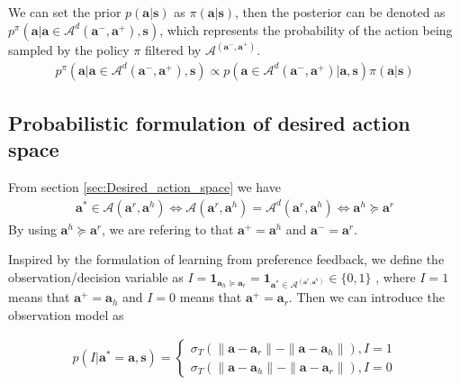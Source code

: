 We can set the prior $p(\bm a | \bm s)$ as $\pi(\bm a| \bm s)$, then
the posterior can be denoted as $ p^{\pi} (  \bm a |\bm a \in \mathcal{A}^d{(\bm a^-, \bm a^+)},  \bm s)$, which represents the probability of the action being sampled by the policy $\pi$ filtered by $\mathcal{A}^{(\bm a^-, \bm a^+)}$. 
\begin{align}
p^\pi ( \bm a |  \bm a \in \mathcal{A}^d{(\bm a^-, \bm a^+)},  \bm s) \propto { p (\bm a \in \mathcal{A}^d{(\bm a^-, \bm a^+)} | \bm a ,\bm s) \pi(\bm a | \bm s)} 
\end{align}


\subsection{Probabilistic formulation of desired action space}
\label{section:prob_desired_action_space}

From section \ref{sec:Desired_action_space} we have 
\begin{align}
\bm a^* \in \mathcal{A} {(\bm a^r, \bm a^h)} \Leftrightarrow \mathcal{A} {(\bm a^r, \bm a^h)}  = \mathcal{A}^d {(\bm a^r, \bm a^h)}  	\Leftrightarrow \bm a^h \succeq \bm a^r
\end{align}
By using $\bm a^h \succeq \bm a^r$, we are refering to that $\bm a^+ = \bm a^ h$ and  $\bm a^- = \bm a^r$.


Inspired by the formulation of learning from preference feedback, we define the observation/decision variable as $I = \mathbf{1}_{\bm a_h \succeq \bm a_r}  = \mathbf{1}_{\bm a^* \in \mathcal{A}^{(\bm a^r, \bm a^h)}} \in \{0, 1\}$ , where $I = 1$ means that $\bm a^{+} = \bm a_h$ and $I = 0$ means that $\bm a^+ = \bm a_r$.
Then we can introduce the observation model as


\begin{align*}
    p (I |  \bm a^* = \bm a, \bm s) =   \left\{ {\begin{array}{*{20}{c}}
	 \sigma_T(\| \bm a- \bm a_r\| - \| \bm a- \bm a_h\|), I = 1\\
	 \sigma_T(\| \bm a- \bm a_h\| - \| \bm a- \bm a_r\|), I = 0
	\end{array}} \right. 
\end{align*}


